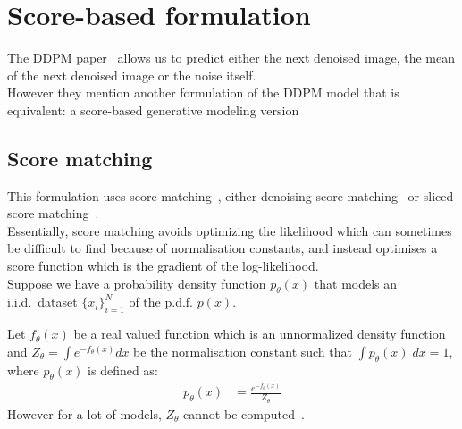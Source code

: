 \documentclass[twoside]{article}
\numberwithin{equation}{section}
\numberwithin{figure}{section}
\begin{document}
\section{Score-based formulation}
The DDPM paper~\cite{ho2020denoising} allows us to predict either the next denoised image, the mean of the next denoised image or the noise itself. \\
However they mention another formulation of the DDPM model that is equivalent: a score-based generative modeling version
\subsection{Score matching}
This formulation uses score matching~\cite{hyvarinen2005}, either denoising score matching~\cite{vincent2010denoising} or sliced score matching~\cite{song2019sliced}. \\
Essentially, score matching avoids optimizing the likelihood which can sometimes be difficult to find because of normalisation constants, and instead optimises a score function which is the gradient of the log-likelihood. \\
Suppose we have a probability density function $p_\theta (x)$ that models an i.i.d.\ dataset $\{x_i\}_{i=1}^N$ of the p.d.f. $p(x)$. 

Let $f_\theta (x)$ be a real valued function which is an unnormalized density function and $Z_\theta = \int e^{-f_\theta (x)} dx$ be the normalisation constant such that $\int p_\theta (x) \; dx = 1$, where $p_\theta(x)$ is defined as:
\begin{align}
  p_\theta (x) &= \frac{e^{-f_\theta (x)}}{Z_\theta}
\end{align}
However for a lot of models, $Z_\theta$ cannot be computed~\cite{luo2022understanding}. \\
\end{document}
